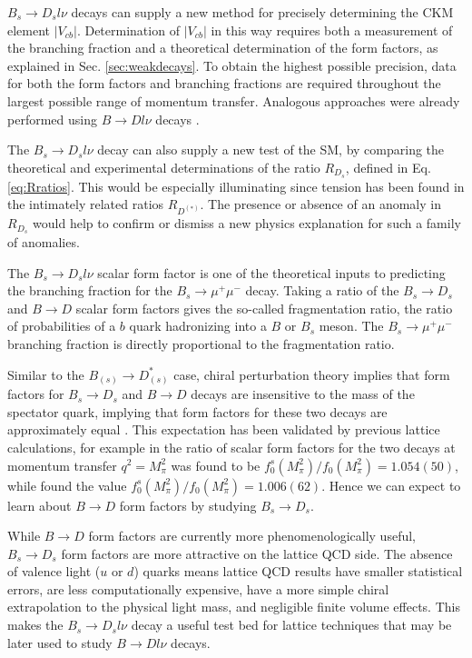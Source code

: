 $B_s\to D_s l\nu$ decays can supply a new method for precisely determining the CKM element $|V_{cb}|$. Determination of $|V_{cb}|$ in this way requires both a measurement of the branching fraction and a theoretical determination of the form factors, as explained in Sec. \ref{sec:weakdecays}. To obtain the highest possible precision, data for both the form factors and branching fractions are required throughout the largest possible range of momentum transfer. Analogous approaches were already performed using $B\to D l \nu$ decays \cite{Buskulic:1996yq,Bartelt:1998dq,Aubert:2008yv,Aubert:2009ac,Lattice:2015rga,Na:2015kha,Glattauer:2015teq}. 

The $B_s\to D_s l\nu$ decay can also supply a new test of the SM, by comparing the theoretical and experimental determinations of the ratio $R_{D_s}$, defined in Eq. \eqref{eq:Rratios}. This would be especially illuminating since tension has been found in the intimately related ratios $R_{D^{(*)}}$. The presence or absence of an anomaly in $R_{D_s}$ would help to confirm or dismiss a new physics explanation for such a family of anomalies.

The $B_s\to D_s l\nu$ scalar form factor is one of the theoretical inputs to predicting the branching fraction for the $B_s \to \mu^+\mu^-$ decay. Taking a ratio of the $B_s\to D_s$ and $B\to D$ scalar form factors gives the so-called fragmentation ratio, the ratio of probabilities of a $b$ quark hadronizing into a $B$ or $B_s$ meson. The $B_s\to \mu^+\mu^-$ branching fraction is directly proportional to the fragmentation ratio.

Similar to the $B_{(s)}\to D_{(s)}^*$ case, chiral perturbation theory implies that form factors for $B_s \to D_s$ and $B \to D$ decays are insensitive to the mass of the spectator quark, implying that form factors for these two decays are approximately equal \cite{Laiho:2005ue}. This expectation has been validated by previous lattice calculations, for example in \cite{PhysRevD.85.114502} the ratio of scalar form factors for the two decays at momentum transfer $q^2=M^2_{\pi}$ was found to be $f^s_0(M_{\pi}^2)/f_0(M_{\pi}^2) = 1.054(50)$, while \cite{Monahan:2017uby} found the value $f^s_0(M_{\pi}^2)/f_0(M_{\pi}^2) = 1.006(62)$. Hence we can expect to learn about $B\to D$ form factors by studying $B_s\to D_s$. 

While $B\to D$ form factors are currently more phenomenologically useful, $B_s\to D_s$ form factors are more attractive on the lattice QCD side. The absence of valence light ($u$ or $d$) quarks means lattice QCD results have smaller statistical errors, are less computationally expensive, have a more simple chiral extrapolation to the physical light mass, and negligible finite volume effects. This makes the $B_s \to D_s l\nu$ decay a useful test bed for lattice techniques that may be later used to study $B \to D l \nu$ decays.

